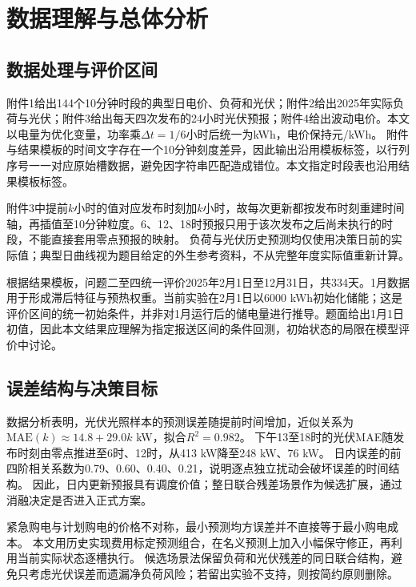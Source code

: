 \section{数据理解与总体分析}
\subsection{数据处理与评价区间}
附件1给出144个10分钟时段的典型日电价、负荷和光伏；附件2给出2025年实际负荷与光伏；附件3给出每天四次发布的24小时光伏预报；附件4给出波动电价。本文以电量为优化变量，功率乘$\Delta t=1/6$小时后统一为kWh，电价保持元/kWh。
附件与结果模板的时间文字存在一个10分钟刻度差异，因此输出沿用模板标签，以行列序号一一对应原始槽数据，避免因字符串匹配造成错位。本文指定时段表也沿用结果模板标签。

附件3中提前$k$小时的值对应发布时刻加$k$小时，故每次更新都按发布时刻重建时间轴，再插值至10分钟粒度。6、12、18时预报只用于该次发布之后尚未执行的时段，不能直接套用零点预报的映射。
负荷与光伏历史预测均仅使用决策日前的实际值；典型日曲线视为题目给定的外生参考资料，不从完整年度实际值重新计算。

根据结果模板，问题二至四统一评价2025年2月1日至12月31日，共334天。1月数据用于形成滞后特征与预热权重。当前实验在2月1日以6000 kWh初始化储能；这是评价区间的统一初始条件，并非对1月运行后的储电量进行推导。题面给出1月1日初值，因此本文结果应理解为指定报送区间的条件回测，初始状态的局限在模型评价中讨论。

\subsection{误差结构与决策目标}
数据分析表明，光伏光照样本的预测误差随提前时间增加，近似关系为
$\mathrm{MAE}(k)\approx14.8+29.0k$ kW，拟合$R^2=0.982$。
下午13至18时的光伏MAE随发布时刻由零点推进至6时、12时，从413 kW降至248 kW、76 kW。
日内误差的前四阶相关系数为0.79、0.60、0.40、0.21，说明逐点独立扰动会破坏误差的时间结构。
因此，日内更新预报具有调度价值；整日联合残差场景作为候选扩展，通过消融决定是否进入正式方案。

紧急购电与计划购电的价格不对称，最小预测均方误差并不直接等于最小购电成本。
本文用历史实现费用标定预测组合，在名义预测上加入小幅保守修正，再利用当前实际状态逐槽执行。
候选场景法保留负荷和光伏残差的同日联合结构，避免只考虑光伏误差而遗漏净负荷风险；若留出实验不支持，则按简约原则删除。

